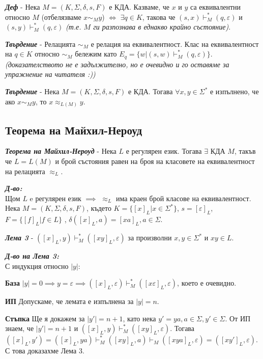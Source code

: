 \documentclass[fleqn,12pt]{article}
\begin{document}
\begin{flushleft}
\textit{\textbf{Деф}} - Нека $M = (K, \Sigma, \delta, s, F)$ е КДА. Казваме, че $x$ и $y$ са еквивалентни относно $M$ (отбелязваме $x \sim_M y$) $\iff$ $\exists q \in K$, такова че $(s, x) \vdash_M^* (q, \varepsilon)$ и  $(s, y) \vdash_M^* (q, \varepsilon)$ \textit{(т.е. $M$ ги разпознава в еднакво крайно състояние)}.

\textit{\textbf{Твърдение}} - Релацията $\sim_M$ е релация на еквивалентност. Клас на еквивалентност на $q \in K$ относно $\sim_M$ бележим като $E_q = \{w | (s, w) \vdash_M^* (q, \varepsilon)\}$. \textit{(доказателството не е задължително, но е очевидно и го оставяме за упражнение на читателя :))}

\textit{\textbf{Твърдение}} - Нека $M = (K, \Sigma, \delta, s, F)$ е КДА. Тогава $\forall x, y \in \Sigma^*$ е изпълнено, че ако $x \sim_M y$, то $x \approx_{L(M)} y$.

\subsection{Теорема на Майхил-Нероуд}

\textit{\textbf{Теорема на Майхил-Нероуд}} - Нека $L$ е регулярен език. Тогава $\exists$ КДА $M$, такъв че $L = L(M)$ и брой състояния равен на броя на класовете на еквивалентност на релацията $\approx_L$.

\textit{\textbf{Д-во:}}\\
Щом $L$ e регулярен език $\implies$ $\approx_L$ има краен брой класове на еквивалентност. \\
Нека $M = (K, \Sigma, \delta, s, F)$, където $K = \{[x]_L | x \in \Sigma^*\}$, $s = [\varepsilon]_L$, $F = \{[f]_L | f \in L\}$ , $\delta([x]_L, a) = [xa]_L, a \in \Sigma$.

\textit{\textbf{Лема 3}} - $([x]_L, y) \vdash_M^* ([xy]_L, \varepsilon)$ за произволни $x, y \in \Sigma^*$ и $xy \in L$.

\textit{\textbf{Д-во на Лема 3:}}\\
С индукция относно $|y|$:

\textbf{База} $|y| = 0 \implies y = \varepsilon \implies ([x]_L, \varepsilon) \vdash_M^* ([x\varepsilon]_L, \varepsilon)$, което е очевидно.

\textbf{ИП} Допускаме, че лемата е изпълнена за $|y| = n$.

\textbf{Стъпка} Ще я докажем за $|y'| = n + 1$, като нека $y' = ya, a \in \Sigma, y' \in \Sigma$. От ИП знаем, че $|y'| = n+1$ и $([x]_L, y) \vdash_M^* ([xy]_L, \varepsilon)$. Тогава $([x]_L, y') = ([x]_L, ya) \vdash_M^* ([xy]_L, a) \vdash_M ([xya]_L, \varepsilon) = ([xy']_L, \varepsilon)$. С това доказахме Лема 3.


\end{flushleft}
\end{document}
